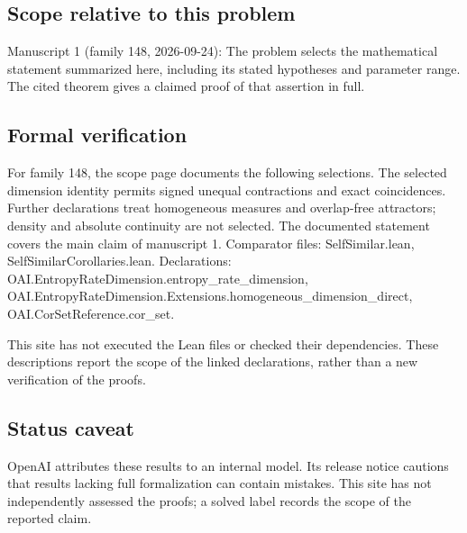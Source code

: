 \documentclass[11pt]{article}
\begin{document}
\subsection{Scope relative to this problem}
Manuscript 1 (family 148, 2026-09-24): The problem selects the mathematical statement summarized here, including its stated hypotheses and parameter range. The cited theorem gives a claimed proof of that assertion in full.

\subsection{Formal verification}
For family 148, the scope page documents the following selections. The selected dimension identity permits signed unequal contractions and exact coincidences. Further declarations treat homogeneous measures and overlap-free attractors; density and absolute continuity are not selected. The documented statement covers the main claim of manuscript 1. Comparator files: SelfSimilar.lean, SelfSimilarCorollaries.lean. Declarations: OAI.EntropyRateDimension.entropy\_rate\_dimension, OAI.EntropyRateDimension.Extensions.homogeneous\_dimension\_direct, OAI.CorSetReference.cor\_set.

This site has not executed the Lean files or checked their dependencies. These descriptions report the scope of the linked declarations, rather than a new verification of the proofs.

\subsection{Status caveat}
OpenAI attributes these results to an internal model. Its release notice cautions that results lacking full formalization can contain mistakes. This site has not independently assessed the proofs; a solved label records the scope of the reported claim.
\end{document}

